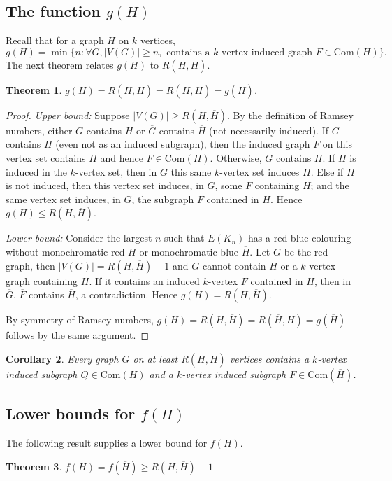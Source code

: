\documentclass[a4paper,12pt]{article}
\newtheorem{theorem}{Theorem}[section]
\newtheorem{corollary}[theorem]{Corollary}
\begin{document}
\subsection{The function $g(H)$}
Recall that for a graph $H$ on $k$ vertices, \[g(H) = \min\{n : \forall G, |V (G)|\geq n,\mbox{ contains a $k$-vertex induced graph $F \in \text{Com}(H)$}\}.\] The next theorem relates $g(H)$ to $R(H, \overline{H})$.

\begin{theorem} \label{gH}
$g(H) = R(H, \overline{H}) = R(\overline{H}, H) = g(\overline{H})$.
\end{theorem}
\begin{proof}
\textit{Upper bound:} Suppose $|V(G)| \ge R(H, \overline{H})$. 
By the definition of Ramsey numbers, either $G$ contains $H$ or $\overline{G}$ contains $\overline{H}$ (not necessarily induced). If $G$ contains $H$ (even not as an induced subgraph), then the induced graph $F$ on this vertex set contains $H$ and hence $F \in \text{Com}(H)$. Otherwise, $\overline{G}$ contains $\overline{H}$. If $\overline{H}$ is induced in the $k$-vertex set, then in $G$ this same $k$-vertex set induces $H$. 
Else if $\overline{H}$ is not induced, then this vertex set induces, in $\overline{G}$, some $\overline{F}$ containing $\overline{H}$; and the same vertex set induces, in $G$, the subgraph ${F}$ contained in $H$. Hence $g(H) \leq R(H,\overline{H})$.

\textit{Lower bound:} Consider the largest $n$ such that $E(K_n)$ has a red-blue colouring without monochromatic red $H$ or monochromatic blue $\overline{H}$. Let $G$ be the red graph, then $|V(G)| = R(H, \overline{H}) - 1$ and $G$ cannot contain $H$ or a $k$-vertex graph containing $H$. If it contains an induced $k$-vertex $F$ contained in $H$, then in $\overline{G}$, $\overline{F}$ contains $\overline{H}$, a contradiction. Hence $g(H) = R(H, \overline{H})$.

By symmetry of Ramsey numbers, $g(H) = R(H, \overline{H}) = R(\overline{H}, H) = g(\overline{H})$ follows by the same argument.
\end{proof}
\begin{corollary}Every graph $G$ on at least $R(H, \overline{H})$ vertices contains a $k$-vertex induced subgraph $Q \in \text{Com}(H)$ and a $k$-vertex induced subgraph $F\in \text{Com}(\overline{H})$.
\end{corollary}



\subsection{Lower bounds for $f(H)$}
The following result supplies a lower bound for $f(H)$.
\begin{theorem} \label{minfH}
$f(H)=f(\overline{H}) \geq R(H,\overline{H}) - 1$

\end{theorem}
\end{document}
